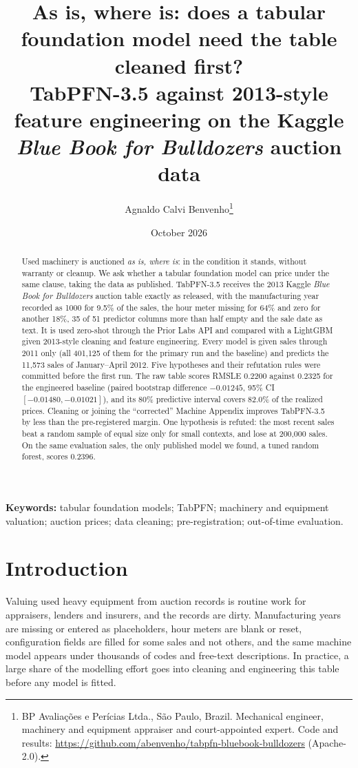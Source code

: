 \documentclass[11pt,a4paper]{article}
\title{\textbf{As is, where is: does a tabular foundation model need the table cleaned first?}\\[6pt]
\large TabPFN-3.5 against 2013-style feature engineering on the Kaggle \emph{Blue Book for Bulldozers} auction data}
\author{Agnaldo Calvi Benvenho\thanks{BP Avalia\c{c}\~oes e Per\'icias Ltda., S\~ao Paulo, Brazil. Mechanical engineer, machinery and equipment appraiser and court-appointed expert. Code and results: \url{https://github.com/abenvenho/tabpfn-bluebook-bulldozers} (Apache-2.0).}}
\date{October 2026}
\begin{document}
\maketitle

\begin{abstract}
\noindent Used machinery is auctioned \emph{as is, where is}: in the condition it stands, without warranty or cleanup. We ask whether a tabular foundation model can price under the same clause, taking the data as published. TabPFN-3.5 receives the 2013 Kaggle \emph{Blue Book for Bulldozers} auction table exactly as released, with the manufacturing year recorded as 1000 for 9.5\% of the sales, the hour meter missing for 64\% and zero for another 18\%, 35 of 51 predictor columns more than half empty and the sale date as text. It is used zero-shot through the Prior Labs API and compared with a LightGBM given 2013-style cleaning and feature engineering. Every model is given sales through 2011 only (all 401,125 of them for the primary run and the baseline) and predicts the 11,573 sales of January--April 2012. Five hypotheses and their refutation rules were committed before the first run. The raw table scores RMSLE 0.2200 against 0.2325 for the engineered baseline (paired bootstrap difference $-0.01245$, 95\% CI $[-0.01480, -0.01021]$), and its 80\% predictive interval covers 82.0\% of the realized prices. Cleaning or joining the ``corrected'' Machine Appendix improves TabPFN-3.5 by less than the pre-registered margin. One hypothesis is refuted: the most recent sales beat a random sample of equal size only for small contexts, and lose at 200,000 sales. On the same evaluation sales, the only published model we found, a tuned random forest, scores 0.2396.
\end{abstract}

\noindent\textbf{Keywords:} tabular foundation models; TabPFN; machinery and equipment valuation; auction prices; data cleaning; pre-registration; out-of-time evaluation.

\section{Introduction}

Valuing used heavy equipment from auction records is routine work for appraisers, lenders and insurers, and the records are dirty. Manufacturing years are missing or entered as placeholders, hour meters are blank or reset, configuration fields are filled for some sales and not others, and the same machine model appears under thousands of codes and free-text descriptions. In practice, a large share of the modelling effort goes into cleaning and engineering this table before any model is fitted.
\end{document}
